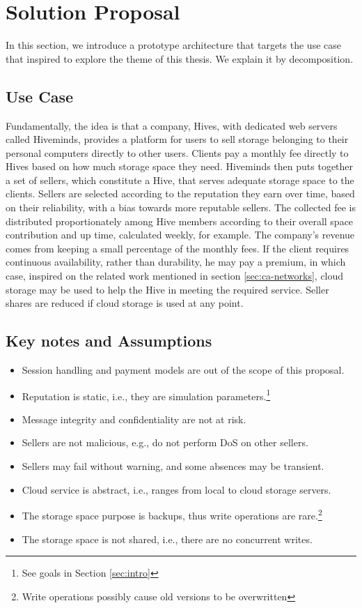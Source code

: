 \documentclass[runningheads]{llncs}
\begin{document}
\newpage\section{Solution Proposal}\label{sec:proposal}
In this section, we introduce a prototype architecture that targets the use case that inspired to explore the theme of this thesis. We explain it by decomposition.

\subsection{Use Case}
Fundamentally, the idea is that a company, Hives, with dedicated web servers called Hiveminds, provides a platform for users to sell storage belonging to their personal computers directly to other users. Clients pay a monthly fee directly to Hives based on how much storage space they need. Hiveminds then puts together a set of sellers, which constitute a Hive, that serves adequate storage space to the clients. Sellers are selected according to the reputation they earn over time, based on their reliability, with a bias towards more reputable sellers. The collected fee is distributed proportionately among Hive members according to their overall space contribution and up time, calculated weekly, for example. The company's revenue comes from keeping a small percentage of the monthly fees. If the client requires continuous availability, rather than durability, he may pay a premium, in which case, inspired on the related work mentioned in section \ref{sec:ca-networks}, cloud storage may be used to help the Hive in meeting the required service. Seller shares are reduced if cloud storage is used at any point.

\subsection{Key notes and Assumptions}
\begin{itemize}
    \item Session handling and payment models are out of the scope of this proposal.
    \item Reputation is static, i.e., they are simulation parameters.\footnote{See goals in Section \ref{sec:intro}}
    \item Message integrity and confidentiality are not at risk.
    \item Sellers are not malicious, e.g., do not perform DoS on other sellers.
    \item Sellers may fail without warning, and some absences may be transient.
    \item Cloud service is abstract, i.e., ranges from local to cloud storage servers.
    \item The storage space purpose is backups, thus write operations are rare.\footnote{Write operations possibly cause old versions to be overwritten}
    \item The storage space is not shared, i.e., there are no concurrent writes.
\end{itemize}
\end{document}
